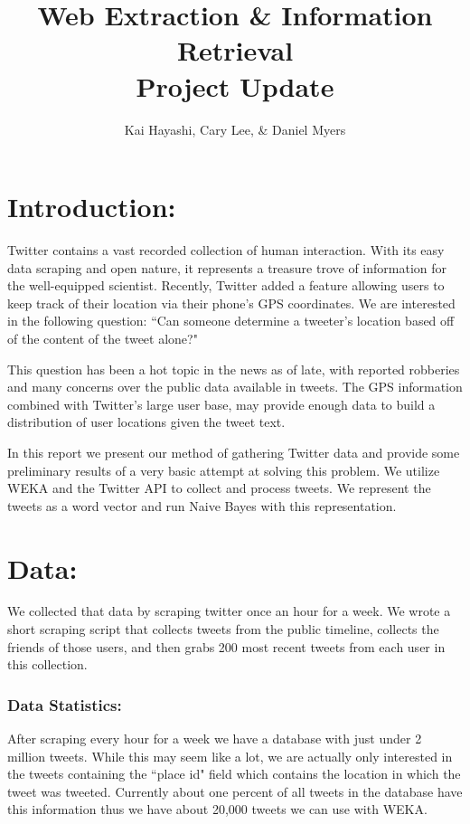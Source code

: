 \documentclass[12pt]{article}
\title{Web Extraction \& Information Retrieval \\ Project Update}
\author{Kai Hayashi, Cary Lee, \& Daniel Myers}
\date{}                                           %
\begin{document}
\maketitle
\section*{Introduction:}
Twitter contains a vast recorded collection of human interaction. With its easy data scraping and open nature, it represents a treasure trove of information for the well-equipped scientist. Recently, Twitter added a feature allowing users to keep track of their location via their phone's GPS coordinates. We are interested in the following question: ``Can someone determine a tweeter's location based off of the content of the tweet alone?"

This question has been a hot topic in the news as of late, with reported robberies and many concerns over the public data available in tweets. The GPS information combined with Twitter's large user base, may provide enough data to build a distribution of user locations given the tweet text. 

In this report we present our method of gathering Twitter data and provide some preliminary results of a very basic attempt at solving this problem. We utilize WEKA and the Twitter API to collect and process tweets. We represent the tweets as a word vector and run Naive Bayes with this representation.

\section*{Data:}
We collected that data by scraping twitter once an hour for a week. We wrote a short scraping script that collects tweets from the public timeline, collects the friends of those users, and then grabs 200 most recent tweets from each user in this collection. 


\subsubsection*{Data Statistics:}
After scraping every hour for a week we have a database with just under 2 million tweets.  While this may seem like a lot, we are actually only interested in the tweets containing the ``place id" field which contains the location in which the tweet was tweeted.  Currently about one percent of all tweets in the database have this information thus we have about 20,000 tweets we can use with WEKA.
\end{document}
